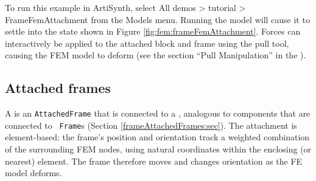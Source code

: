 To run this example in ArtiSynth, select {\sf All demos > tutorial >
FrameFemAttachment} from the {\sf Models} menu. Running the model will
cause it to settle into the state shown in Figure
\ref{fig:fem:frameFemAttachment}. Forces can interactively
be applied to the attached block and frame using the
pull tool, causing the FEM model to deform 
(see the section ``Pull Manipulation'' in the
).

\subsection{Attached frames}

A  is an {\tt AttachedFrame} that is
connected to a , analogous to
 components that are connected to {\tt
Frame}s (Section \ref{frameAttachedFrames:sec}). The attachment is
element-based: the frame's position and orientation track a weighted
combination of the surrounding FEM nodes, using natural coordinates within the
enclosing (or nearest) element. The frame therefore moves and changes
orientation as the FE model deforms.

